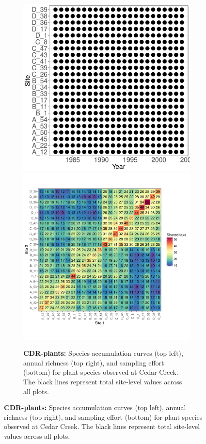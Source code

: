 \documentclass[11pt, oneside]{article}
\begin{document}
\begin{figure}[h!]
\begin{figure}[h!]
\includegraphics[scale = 0.4]{cdr-plants-compagnoni_spatiotemporal_sampling_effort.pdf}
\includegraphics[scale = 0.4]{cdr-plants-compagnoni_spp_shared.pdf}
\caption{{\bf CDR-plants:} Species accumulation curves (top left),  annual richness (top right), and sampling effort (bottom)  for plant species observed at Cedar Creek. The black lines represent total site-level values across all plots.}
\label{cdr-plants}
\end{figure}




\end{figure}
\end{document}
